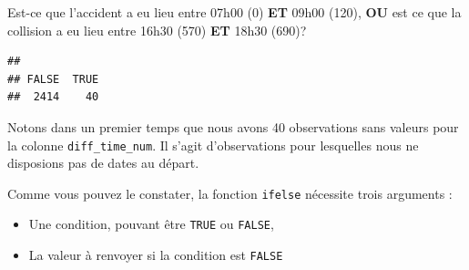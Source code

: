 \documentclass[
  11pt,
  french,
]{book}
\makeatletter
\newenvironment{Shaded}{\begin{snugshade}}{\end{snugshade}}
\newcommand{\DecValTok}[1]{\textcolor[rgb]{0.00,0.00,0.81}{#1}}
\newcommand{\KeywordTok}[1]{\textcolor[rgb]{0.13,0.29,0.53}{\textbf{#1}}}
\newcommand{\NormalTok}[1]{#1}
\newcommand{\OperatorTok}[1]{\textcolor[rgb]{0.81,0.36,0.00}{\textbf{#1}}}
\newcommand{\StringTok}[1]{\textcolor[rgb]{0.31,0.60,0.02}{#1}}
\providecommand{\tightlist}{%
  \setlength{\itemsep}{0pt}\setlength{\parskip}{0pt}}
\newenvironment{kframe}{%
\medskip{}
\setlength{\fboxsep}{.8em}
 \def\at@end@of@kframe{}%
 \ifinner\ifhmode%
  \def\at@end@of@kframe{\end{minipage}}%
  \begin{minipage}{\columnwidth}%
 \fi\fi%
 \def\FrameCommand##1{\hskip\@totalleftmargin \hskip-\fboxsep
 \colorbox{shadecolor}{##1}\hskip-\fboxsep
     \hskip-\linewidth \hskip-\@totalleftmargin \hskip\columnwidth}%
 \MakeFramed {\advance\hsize-\width
   \@totalleftmargin\z@ \linewidth\hsize
   \@setminipage}}%
 {\par\unskip\endMakeFramed%
 \at@end@of@kframe}
\renewenvironment{Shaded}{\begin{kframe}}{\end{kframe}}
\makeatother
\begin{document}
Est-ce que l'accident a eu lieu entre 07h00 (0) \textbf{ET} 09h00 (120), \textbf{OU} est ce que la collision a eu lieu entre 16h30 (570) \textbf{ET} 18h30 (690)?

\begin{Shaded}
\end{Shaded}

\begin{verbatim}
## 
## FALSE  TRUE 
##  2414    40
\end{verbatim}

Notons dans un premier temps que nous avons 40 observations sans valeurs pour la colonne \texttt{diff\_time\_num}. Il s'agit d'observations pour lesquelles nous ne disposions pas de dates au départ.

\begin{Shaded}
\end{Shaded}

Comme vous pouvez le constater, la fonction \texttt{ifelse} nécessite trois arguments :

\begin{itemize}
\tightlist
\item
  Une condition, pouvant être \texttt{TRUE} ou \texttt{FALSE},
\item
  La valeur à renvoyer si la condition est \texttt{FALSE}
\end{itemize}
\end{document}
